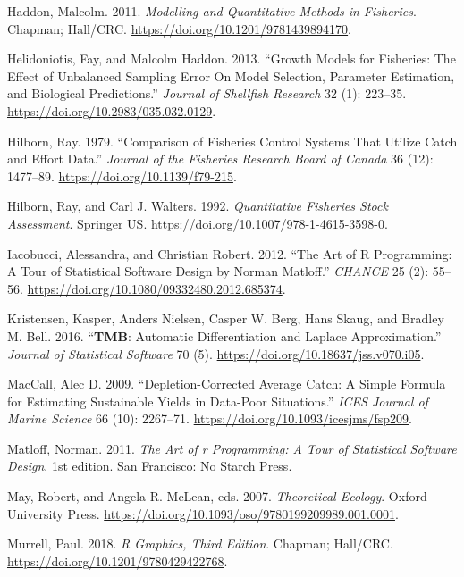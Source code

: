 \documentclass[
  lang=cn,
  11pt,
  scheme=chinese,
  chinesefont=nofont,
  citestyle=gb7714-2015,
  bibstyle=gb7714-2015]{elegantbook}
\newlength{\cslhangindent}
\newenvironment{CSLReferences}[2] %
 {\begin{list}{}{%
  \setlength{\itemindent}{0pt}
  \setlength{\leftmargin}{0pt}
  \setlength{\parsep}{0pt}
  \ifodd #1
   \setlength{\leftmargin}{\cslhangindent}
   \setlength{\itemindent}{-1\cslhangindent}
  \fi
  \setlength{\itemsep}{#2\baselineskip}}}
 {\end{list}}
\begin{document}
\begin{CSLReferences}{1}{0}
Haddon, Malcolm. 2011. \emph{Modelling and Quantitative Methods in Fisheries}. Chapman; Hall/CRC. \url{https://doi.org/10.1201/9781439894170}.

Helidoniotis, Fay, and Malcolm Haddon. 2013. {``Growth Models for Fisheries: The Effect of Unbalanced Sampling Error On Model Selection, Parameter Estimation, and Biological Predictions.''} \emph{Journal of Shellfish Research} 32 (1): 223--35. \url{https://doi.org/10.2983/035.032.0129}.

Hilborn, Ray. 1979. {``Comparison of Fisheries Control Systems That Utilize Catch and Effort Data.''} \emph{Journal of the Fisheries Research Board of Canada} 36 (12): 1477--89. \url{https://doi.org/10.1139/f79-215}.

Hilborn, Ray, and Carl J. Walters. 1992. \emph{Quantitative Fisheries Stock Assessment}. Springer US. \url{https://doi.org/10.1007/978-1-4615-3598-0}.

Iacobucci, Alessandra, and Christian Robert. 2012. {``The Art of R Programming: A Tour of Statistical Software Design by Norman Matloff.''} \emph{CHANCE} 25 (2): 55--56. \url{https://doi.org/10.1080/09332480.2012.685374}.

Kristensen, Kasper, Anders Nielsen, Casper W. Berg, Hans Skaug, and Bradley M. Bell. 2016. {``{\textbf{TMB}}: Automatic Differentiation and Laplace Approximation.''} \emph{Journal of Statistical Software} 70 (5). \url{https://doi.org/10.18637/jss.v070.i05}.

MacCall, Alec D. 2009. {``Depletion-Corrected Average Catch: A Simple Formula for Estimating Sustainable Yields in Data-Poor Situations.''} \emph{ICES Journal of Marine Science} 66 (10): 2267--71. \url{https://doi.org/10.1093/icesjms/fsp209}.

Matloff, Norman. 2011. \emph{The Art of r Programming: A Tour of Statistical Software Design}. 1st edition. San Francisco: No Starch Press.

May, Robert, and Angela R. McLean, eds. 2007. \emph{Theoretical Ecology}. Oxford University Press. \url{https://doi.org/10.1093/oso/9780199209989.001.0001}.

Murrell, Paul. 2018. \emph{R Graphics, Third Edition}. Chapman; Hall/CRC. \url{https://doi.org/10.1201/9780429422768}.


\end{CSLReferences}
\end{document}
